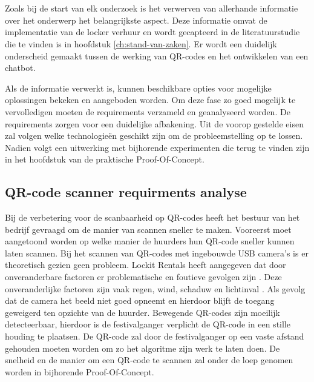 
\chapter{}%
\label{ch:methodologie}


Zoals bij de start van elk onderzoek is het verwerven van allerhande informatie over het onderwerp het belangrijkste aspect. Deze informatie omvat de implementatie van de locker verhuur en wordt gecapteerd in de literatuurstudie die te vinden is in hoofdstuk \ref{ch:stand-van-zaken}. Er wordt een duidelijk onderscheid gemaakt tussen de werking van QR-codes en het ontwikkelen van een chatbot. 

Als de informatie verwerkt is, kunnen beschikbare opties voor mogelijke oplossingen bekeken en aangeboden worden. Om deze fase zo goed mogelijk te vervolledigen moeten de requirements verzameld en geanalyseerd worden. De requirements zorgen voor een duidelijke afbakening. Uit de voorop gestelde eisen zal volgen welke technologieën geschikt zijn om de probleemstelling op te lossen. Nadien volgt een uitwerking met bijhorende experimenten die terug te vinden zijn in het hoofdstuk van de praktische Proof-Of-Concept.

\section{QR-code scanner requirments analyse}%
\label{sec:scannerRequirment}

Bij de verbetering voor de scanbaarheid op QR-codes heeft het bestuur van het bedrijf gevraagd om de manier van scannen sneller te maken. Vooreerst moet aangetoond worden op welke manier de huurders hun QR-code sneller kunnen laten scannen. Bij het scannen van QR-codes met ingebouwde USB camera’s is er theoretisch gezien geen probleem. Lockit Rentals heeft aangegeven dat door onveranderbare factoren er problematische en foutieve gevolgen zijn \autocite{Girisha2022}. Deze onveranderlijke factoren zijn vaak regen, wind, schaduw en lichtinval \autocite{Ou2014}.  Als gevolg dat de camera het beeld niet goed opneemt en hierdoor blijft de toegang geweigerd ten opzichte van de huurder. 
Bewegende QR-codes zijn moeilijk detecteerbaar, hierdoor is de festivalganger verplicht de QR-code in een stille houding te plaatsen. De QR-code zal door de festivalganger op een vaste afstand gehouden moeten worden om zo het algoritme zijn werk te laten doen\autocite{Suriyon2021}. De snelheid en de manier om een QR-code te scannen zal onder de loep genomen worden in bijhorende Proof-Of-Concept.


